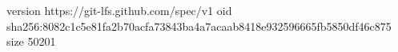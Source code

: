 version https://git-lfs.github.com/spec/v1
oid sha256:8082c1c5e81fa2b70acfa73843ba4a7acaab8418e932596665fb5850df46c875
size 50201
